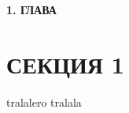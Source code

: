 \newpage
\begin{center}
  \textbf{\large 1. ГЛАВА}
\end{center}


\section{СЕКЦИЯ 1}
tralalero tralala